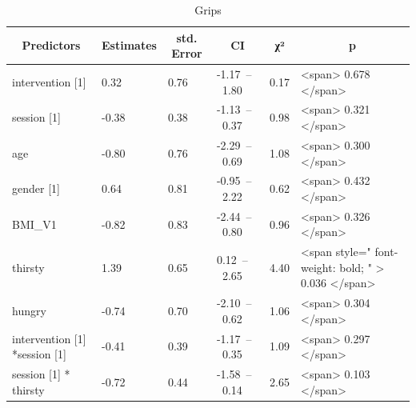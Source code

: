 \documentclass[
]{article}
\newenvironment{Shaded}{\begin{snugshade}}{\end{snugshade}}
\newcommand{\AttributeTok}[1]{\textcolor[rgb]{0.77,0.63,0.00}{#1}}
\newcommand{\CommentTok}[1]{\textcolor[rgb]{0.56,0.35,0.01}{\textit{#1}}}
\newcommand{\DecValTok}[1]{\textcolor[rgb]{0.00,0.00,0.81}{#1}}
\newcommand{\FunctionTok}[1]{\textcolor[rgb]{0.00,0.00,0.00}{#1}}
\newcommand{\NormalTok}[1]{#1}
\newcommand{\OtherTok}[1]{\textcolor[rgb]{0.56,0.35,0.01}{#1}}
\newcommand{\SpecialCharTok}[1]{\textcolor[rgb]{0.00,0.00,0.00}{#1}}
\newcommand{\StringTok}[1]{\textcolor[rgb]{0.31,0.60,0.02}{#1}}
\begin{document}
\begin{Shaded}
\end{Shaded}

\begin{table}[H]

\caption{\label{tab:INST_mod}Grips}
\centering
\begin{tabular}[t]{l|l|l|l|l|l}
\hline
\multicolumn{1}{c}{\textbf{Predictors}} & \multicolumn{1}{c}{\textbf{Estimates}} & \multicolumn{1}{c}{\textbf{std. Error}} & \multicolumn{1}{c}{\textbf{CI}} & \multicolumn{1}{c}{\textbf{χ²}} & \multicolumn{1}{c}{\textbf{p}}\\
\hline
intervention [1] & 0.32 & 0.76 & -1.17 – 1.80 & 0.17 & <span> 0.678 </span>\\
\hline
session [1] & -0.38 & 0.38 & -1.13 – 0.37 & 0.98 & <span> 0.321 </span>\\
\hline
age & -0.80 & 0.76 & -2.29 – 0.69 & 1.08 & <span> 0.300 </span>\\
\hline
gender [1] & 0.64 & 0.81 & -0.95 – 2.22 & 0.62 & <span> 0.432 </span>\\
\hline
BMI_V1 & -0.82 & 0.83 & -2.44 – 0.80 & 0.96 & <span> 0.326 </span>\\
\hline
thirsty & 1.39 & 0.65 & 0.12 – 2.65 & 4.40 & <span style=" font-weight: bold; " > 0.036 </span>\\
\hline
hungry & -0.74 & 0.70 & -2.10 – 0.62 & 1.06 & <span> 0.304 </span>\\
\hline
intervention [1] *session [1] & -0.41 & 0.39 & -1.17 – 0.35 & 1.09 & <span> 0.297 </span>\\
\hline
session [1] * thirsty & -0.72 & 0.44 & -1.58 – 0.14 & 2.65 & <span> 0.103 </span>\\
\hline
\end{tabular}
\end{table}
\end{document}
